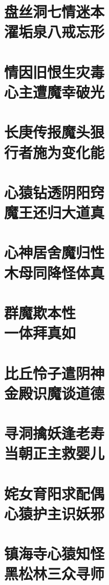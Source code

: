 \documentclass[12pt,UTF8]{ctexbook}
\begin{document}
{\chapter[盘丝洞七情迷本\ 濯垢泉八戒忘形]{盘丝洞七情迷本\\濯垢泉八戒忘形}
\chapter[情因旧恨生灾毒\ 心主遭魔幸破光]{情因旧恨生灾毒\\心主遭魔幸破光}
\chapter[长庚传报魔头狠\ 行者施为变化能]{长庚传报魔头狠\\行者施为变化能}
\chapter[心猿钻透阴阳窍\ 魔王还归大道真]{心猿钻透阴阳窍\\魔王还归大道真}
\chapter[心神居舍魔归性\ 木母同降怪体真]{心神居舍魔归性\\木母同降怪体真}
\chapter[群魔欺本性\ 一体拜真如]{群魔欺本性\\一体拜真如}
\chapter[比丘怜子遣阴神\ 金殿识魔谈道德]{比丘怜子遣阴神\\金殿识魔谈道德}
\chapter[寻洞擒妖逢老寿\ 当朝正主救婴儿]{寻洞擒妖逢老寿\\当朝正主救婴儿}
\chapter[姹女育阳求配偶\ 心猿护主识妖邪]{姹女育阳求配偶\\心猿护主识妖邪}
\chapter[镇海寺心猿知怪\ 黑松林三众寻师]{镇海寺心猿知怪\\黑松林三众寻师}
}
\end{document}
